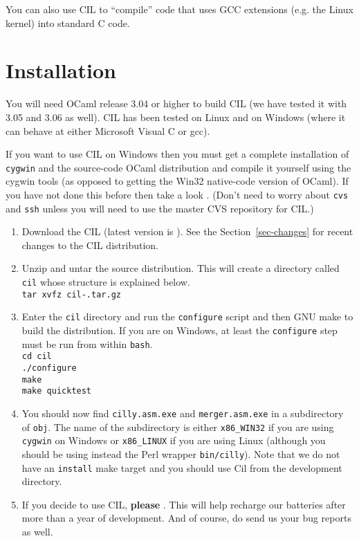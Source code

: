 \documentclass{article}
\def\secref#1{Section~\ref{sec-#1}}
\newcommand{\hsp}{\hspace{0.5in}}
\def\t#1{{\tt #1}}
\begin{document}
 You can also use CIL to ``compile'' code that uses GCC extensions (e.g. the
Linux kernel) into standard C code.

\section{Installation}

You will need OCaml release 3.04 or higher to build CIL (we have tested it
with 3.05 and 3.06 as well). CIL has been tested on Linux and on Windows
(where it can behave at either Microsoft Visual C or gcc).

 If you want to use CIL on Windows then you must get a complete installation
of \t{cygwin} and the source-code OCaml distribution and compile it yourself
using the cygwin tools (as opposed to getting the Win32 native-code version of
OCaml). If you have not done this before then take a look
. (Don't need to worry about \t{cvs} and
\t{ssh} unless you will need to use the master CVS repository for CIL.)

\begin{enumerate}
\item Download the CIL  (latest version is
). See the \secref{changes} for recent changes to the CIL distribution.
\item Unzip and untar the source distribution. This will create a directory
      called \t{cil} whose structure is explained below. \\
      \t{tar xvfz cil-\cilversion.tar.gz}
\item Enter the \t{cil} directory and run the \t{configure} script and then 
      GNU make to build the distribution. If you are on Windows, at least the
      \t{configure} step must be run from within \t{bash}. \\
      \hsp\verb!cd cil!\\
      \hsp\verb!./configure!\\
      \hsp\verb!make!\\
      \hsp\verb!make quicktest!\\

\item You should now find \t{cilly.asm.exe} and \t{merger.asm.exe} in a
subdirectory of \t{obj}. The name of the subdirectory is either \t{x86\_WIN32}
if you are using \t{cygwin} on Windows or \t{x86\_LINUX} if you are using
Linux (although you should be using instead the Perl wrapper \t{bin/cilly}).
Note that we do not have an \t{install} make target and you should use Cil
from the development directory. 
\item If you decide to use CIL, {\bf please}
. This will help recharge
our batteries after more than a year of development. And of course, do send us
your bug reports as well.

\end{enumerate}
\end{document}

